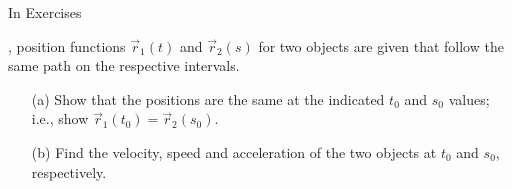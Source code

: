 {\noindent In Exercises}
{ , position functions $\vec r_1(t)$ and $\vec r_2(s)$ for two objects are given that follow the same path on the respective intervals.
	\begin{enumerate}
		\item [(a)] Show that the positions are the same at the indicated $t_0$ and $s_0$ values; i.e., show $\vec r_1(t_0) = \vec r_2(s_0).$
		\item	[(b)] Find the velocity, speed and acceleration of the two objects at $t_0$ and $s_0$, respectively.
	\end{enumerate}
}
